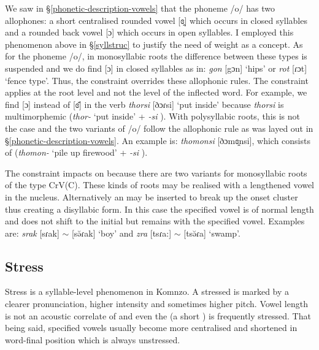 We saw in \S{}\ref{phonetic-description-vowels} that the phoneme /o/ has two allophones: a short centralised rounded vowel [ɞ̯] which occurs in closed syllables and a rounded back vowel [ɔ] which occurs in open syllables. I employed this phenomenon above in \S{}\ref{syllstruc} to justify the need of  weight as a concept. As for the phoneme /o/, in monosyllabic roots the difference between these  types is suspended and we do find [ɔ] in closed syllables as in: \emph{gon} [{\ᵑ}gɔn] `hips' or \emph{rot} [ɾɔt] `fence type'. Thus, the  constraint overrides these allophonic rules. The constraint applies at the root level and not the level of the inflected word. For example, we find [ɔ] instead of [ɞ̆] in the verb \emph{thorsi} [ðɔɾsi] `put inside' because \emph{thorsi} is multimorphemic (\emph{thor-} `put inside' + \emph{-si} \Nmlz{}). With polysyllabic roots, this is not the case and the two variants of /o/ follow the allophonic rule as was layed out in \S{}\ref{phonetic-description-vowels}. An example is: \emph{thomonsi} [ðɔmɞ̯nsi], which consists of (\emph{thomon-} `pile up firewood' + \emph{-si} \Nmlz{}).%

The  constraint impacts on  because there are two variants for monosyllabic roots of the type CrV(C). These kinds of roots may be realised with a lengthened vowel in the nucleus. Alternatively an  may be inserted to break up the onset cluster thus creating a disyllabic form. In this case the specified vowel is of normal length and  does not shift to the initial  but remains with the specified vowel. Examples are: \emph{srak} [sɾak] $\sim$ [sə̆ɾak] `boy' and \emph{zra} [tsɾa:] $\sim$ [tsə̆ɾa] `swamp'.

\subsection{Stress} \label{stress}

Stress is a syllable-level phenomenon in Komnzo. A stressed  is marked by a clearer pronunciation, higher intensity and sometimes higher pitch. Vowel length is not an acoustic correlate of  and even the  (a short ) is frequently stressed. That being said, specified vowels usually become more centralised and shortened in word-final position which is always unstressed.%

